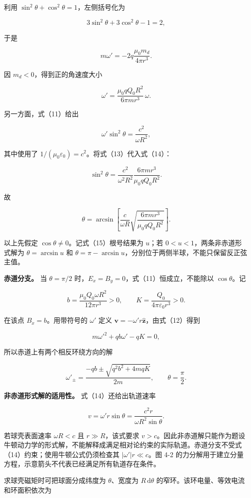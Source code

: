 \documentclass[12pt,a4paper,UTF8]{ctexart}
\begin{document}
利用 \(\sin^2\theta+\cos^2\theta=1\)，左侧括号化为

\[3\sin^2\theta+3\cos^2\theta-1=2,\]

于是

\[m\omega'= -2q\frac{\mu_0m_d}{4\pi r^3}.\]

因 \(m_d<0\)，得到正的角速度大小

\[\boxed{
\omega'=\frac{\mu_0qQ_0R^2}{6\pi mr^3}\,\omega
}. \tag{13}\]

另一方面，式（11）给出

\[\omega'\sin^2\theta=\frac{c^2}{\omega R^2}, \tag{14}\]

其中使用了 \(1/(\mu_0\varepsilon_0)=c^2\)。将式（13）代入式（14）：

\[\sin^2\theta
=\frac{c^2}{\omega^2R^2}
\frac{6\pi mr^3}{\mu_0qQ_0R^2}.\]

故

\[\boxed{
\theta=\arcsin\left[
\frac{c}{\omega R}
\sqrt{\frac{6\pi mr^3}{\mu_0qQ_0R^2}}
\right]
}. \tag{15}\]

以上先假定 \(\cos\theta\ne0\)。记式（15）根号结果为 \(u\)；若
\(0<u<1\)，两条非赤道形式解为 \(\theta=\arcsin u\) 和
\(\theta=\pi-\arcsin u\)，分别位于两侧半球，不能只保留反正弦主值。

\textbf{赤道分支。} 当 \(\theta=\pi/2\)
时，\(E_x=B_y=0\)，式（11）恒成立，不能除以 \(\cos\theta\)。记

\[b=\frac{\mu_0Q_0\omega R^2}{12\pi r^3}>0,\qquad K=\frac{Q_0}{4\pi\varepsilon_0r^3}>0.\]

在该点 \(B_x=b\)。用带符号的 \(\omega'\) 定义
\(\boldsymbol v=-\omega'r\hat{\boldsymbol z}\)，由式（12）得到

\[m\omega'^2+qb\omega'-qK=0,\]

所以赤道上有两个相反环绕方向的解

\[\boxed{\omega'_\pm=\frac{-qb\pm\sqrt{q^2b^2+4mqK}}{2m},\qquad\theta=\frac\pi2}.\]

\textbf{非赤道形式解的适用性。} 式（14）还给出轨道速率

\[v=\omega'r\sin\theta=\frac{c^2r}{\omega R^2\sin\theta}.\]

若球壳表面速率 \(\omega R<c\) 且 \(r\gg R\)，该式要求
\(v>c\)。因此非赤道解只能作为题设牛顿动力学的形式解，不能解释成满足相对论约束的实际轨道。赤道分支不受式（14）约束；使用牛顿公式仍须检查其
\(|\omega'|r\ll c\)。图 4-2
的力分解用于建立分量方程，示意箭头不代表已经满足所有轨道存在条件。

求球壳磁矩时可把球面分成纬度为 \(\theta\)、宽度为 \(R\,\mathrm d\theta\)
的窄环。该环电量、等效电流和环面积依次为
\end{document}
